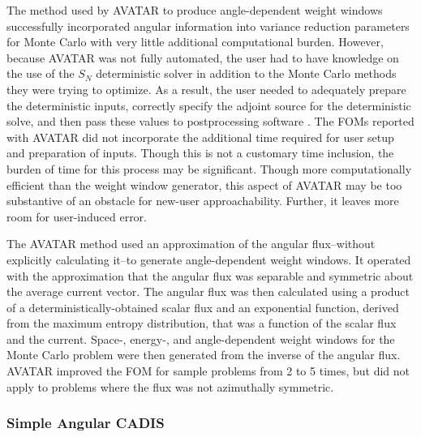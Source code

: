 The method used by AVATAR to produce angle-dependent weight windows successfully
incorporated angular information into variance reduction parameters for Monte Carlo
with very little additional computational burden. However, because AVATAR
was not fully automated, the user had to have knowledge on the use of the $S_N$
deterministic solver in addition to the Monte Carlo methods they were trying to
optimize. As a result, the user needed to adequately prepare the deterministic
inputs, correctly specify the adjoint source for the deterministic solve, and
then pass these values to postprocessing software \cite{peplow_consistent_2012,
evans_enhanced_1998}. The FOMs reported with AVATAR did not incorporate the
additional time required for user setup and preparation of inputs. Though this
is not a customary time inclusion, the burden of time for this process may be
significant. Though more computationally efficient than the weight window generator,
this aspect of AVATAR may be too substantive of an obstacle for new-user
approachability. Further, it leaves more room for user-induced error.

The AVATAR method
\cite{van_riper_generation_1995, van_riper_avatarautomatic_1997} used an
approximation of the angular flux--without explicitly calculating it--to
generate angle-dependent weight windows. It operated with the approximation
that
the angular flux was separable and symmetric about the average current vector.
The angular flux was then calculated using
a product of a deterministically-obtained
scalar flux and an exponential function, derived from the
maximum entropy distribution, that was a function of the scalar flux and the
current. Space-, energy-, and angle-dependent weight windows for
the Monte Carlo problem were then generated from the inverse of the angular
flux. AVATAR improved the FOM for sample problems from 2 to 5 times, but did not
apply to problems where the flux was not azimuthally symmetric.

%

\subsubsection{Simple Angular CADIS}
\label{sec:simpAngCADIS}

